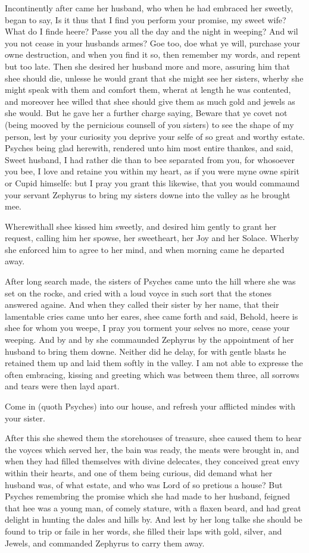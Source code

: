 Incontinently after came her husband, who when he had embraced her sweetly,
began to say, Is it thus that I find you perform your promise, my sweet wife?
What do I finde heere? Passe you all the day and the night in weeping? And wil
you not cease in your husbands armes? Goe too, doe what ye will, purchase your
owne destruction, and when you find it so, then remember my words, and repent
but too late. Then she desired her husband more and more, assuring him that
shee should die, unlesse he would grant that she might see her sisters, wherby
she might speak with them and comfort them, wherat at length he was contented,
and moreover hee willed that shee should give them as much gold and jewels as
she would. But he gave her a further charge saying, Beware that ye covet not
(being mooved by the pernicious counsell of you sisters) to see the shape of my
person, lest by your curiosity you deprive your selfe of so great and worthy
estate. Psyches being glad herewith, rendered unto him most entire thankes, and
said, Sweet husband, I had rather die than to bee separated from you, for
whosoever you bee, I love and retaine you within my heart, as if you were myne
owne spirit or Cupid himselfe: but I pray you grant this likewise, that you
would commaund your servant Zephyrus to bring my sisters downe into the valley
as he brought mee.

Wherewithall shee kissed him sweetly, and desired him gently to grant her
request, calling him her spowse, her sweetheart, her Joy and her Solace. Wherby
she enforced him to agree to her mind, and when morning came he departed away.

After long search made, the sisters of Psyches came unto the hill where she was
set on the rocke, and cried with a loud voyce in such sort that the stones
answered againe. And when they called their sister by her name, that their
lamentable cries came unto her eares, shee came forth and said, Behold, heere
is shee for whom you weepe, I pray you torment your selves no more, cease your
weeping. And by and by she commaunded Zephyrus by the appointment of her
husband to bring them downe. Neither did he delay, for with gentle blasts he
retained them up and laid them softly in the valley. I am not able to expresse
the often embracing, kissing and greeting which was between them three, all
sorrows and tears were then layd apart.

Come in (quoth Psyches) into our house, and refresh your afflicted mindes with
your sister.

After this she shewed them the storehouses of treasure, shee caused them to
hear the voyces which served her, the bain was ready, the meats were brought
in, and when they had filled themselves with divine delecates, they conceived
great envy within their hearts, and one of them being curious, did demand what
her husband was, of what estate, and who was Lord of so pretious a house? But
Psyches remembring the promise which she had made to her husband, feigned that
hee was a young man, of comely stature, with a flaxen beard, and had great
delight in hunting the dales and hills by. And lest by her long talke she
should be found to trip or faile in her words, she filled their laps with gold,
silver, and Jewels, and commanded Zephyrus to carry them away.

